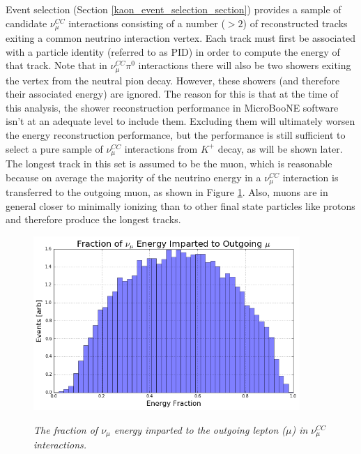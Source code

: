 Event selection (Section \ref{kaon_event_selection_section}) provides a sample of candidate $\nu_\mu^{CC}$ interactions consisting of a number ($>2$) of reconstructed tracks exiting a common neutrino interaction vertex. Each track must first be associated with a particle identity (referred to as PID) in order to compute the energy of that track. Note that in $\nu_\mu^{CC}\pi^0$ interactions there will also be two showers exiting the vertex from the neutral pion decay. However, these showers (and therefore their associated energy) are ignored. The reason for this is that at the time of this analysis, the shower reconstruction performance in MicroBooNE software isn't at an adequate level to include them. Excluding them will ultimately worsen the energy reconstruction performance, but the performance is still sufficient to select a pure sample of $\nu_\mu^{CC}$ interactions from $K^+$ decay, as will be shown later.\\

The longest track in this set is assumed to be the muon, which is reasonable because on average the majority of the neutrino energy in a $\nu_\mu^{CC}$ interaction is transferred to the outgoing muon, as shown in Figure \ref{numuCC_energyfraction_tomuon_fig}. Also, muons are in general closer to minimally ionizing than to other final state particles like protons and therefore produce the longest tracks.\\

\begin{figure}[ht!]
\centering
	\includegraphics[width=0.9\textwidth]{Figures/numuCC_energyfraction_tomuon.png} \\
\caption{\textit{The fraction of $\nu_\mu$ energy imparted to the outgoing lepton ($\mu$) in $\nu_\mu^{CC}$ interactions.}}\label{numuCC_energyfraction_tomuon_fig}
\end{figure}

